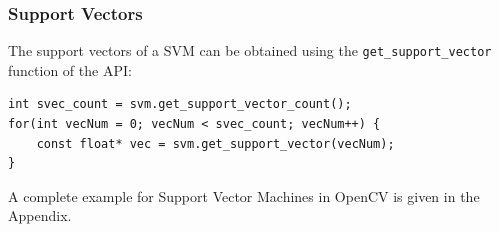 \subsubsection*{Support Vectors}
The support vectors of a SVM can be obtained using the \lstinline|get_support_vector| function of the API:
\begin{lstlisting}
int svec_count = svm.get_support_vector_count();
for(int vecNum = 0; vecNum < svec_count; vecNum++) {
	const float* vec = svm.get_support_vector(vecNum);
}
\end{lstlisting}


A complete example for Support Vector Machines in OpenCV is given in the Appendix.